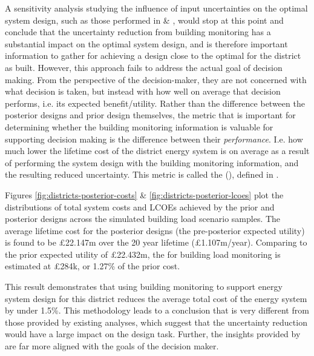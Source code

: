 A sensitivity analysis studying the influence of input uncertainties on the optimal system design, such as those performed in \citep{mavromatidis2018UncertaintyGlobalSensitivity} \& \citep{pickering2019DistrictEnergySystem}, would stop at this point and conclude that the uncertainty reduction from building monitoring has a substantial impact on the optimal system design, and is therefore important information to gather for achieving a design close to the optimal for the district as built. However, this approach fails to address the actual goal of decision making. From the perspective of the decision-maker, they are not concerned with what decision is taken, but instead with how well on average that decision performs, i.e. its expected benefit/utility. Rather than the difference between the posterior designs and prior design themselves, the metric that is important for determining whether the building monitoring information is valuable for supporting decision making is the difference between their \textit{performance}. I.e. how much lower the lifetime cost of the district energy system is on average as a result of performing the system design with the building monitoring information, and the resulting reduced uncertainty. This metric is called the  (), defined in .

Figures \ref{fig:districts-posterior-costs} \& \ref{fig:districts-posterior-lcoes} plot the distributions of total system costs and LCOEs achieved by the prior and posterior designs across the simulated building load scenario samples. The average lifetime cost for the posterior designs (the pre-posterior expected utility) is found to be £22.147m over the 20 year lifetime (£1.107m/year). Comparing to the prior expected utility of £22.432m, the  for building load monitoring is estimated at £284k, or 1.27\% of the prior cost.

This  result demonstrates that using building monitoring to support energy system design for this district reduces the average total cost of the energy system by under 1.5\%. This methodology leads to a conclusion that is very different from those provided by existing analyses, which suggest that the uncertainty reduction would have a large impact on the design task. Further, the insights provided by  are far more aligned with the goals of the decision maker.\\

